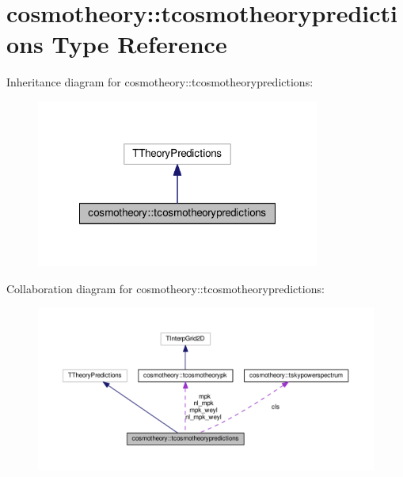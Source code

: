 \hypertarget{structcosmotheory_1_1tcosmotheorypredictions}{}\section{cosmotheory\+:\+:tcosmotheorypredictions Type Reference}
\label{structcosmotheory_1_1tcosmotheorypredictions}


Inheritance diagram for cosmotheory\+:\+:tcosmotheorypredictions\+:
\nopagebreak
\begin{figure}[H]
\begin{center}
\leavevmode
\includegraphics[width=264pt]{structcosmotheory_1_1tcosmotheorypredictions__inherit__graph}
\end{center}
\end{figure}


Collaboration diagram for cosmotheory\+:\+:tcosmotheorypredictions\+:
\nopagebreak
\begin{figure}[H]
\begin{center}
\leavevmode
\includegraphics[width=350pt]{structcosmotheory_1_1tcosmotheorypredictions__coll__graph}
\end{center}
\end{figure}
